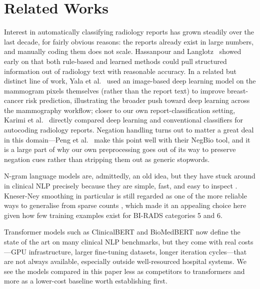 \documentclass[11pt,a4paper]{article}
\begin{document}
\section{Related Works}

Interest in automatically classifying radiology reports has grown steadily
over the last decade, for fairly obvious reasons: the reports already exist in
large numbers, and manually coding them does not scale.
Hassanpour and Langlotz~\cite{hassanpour2017information} showed early on that
both rule-based and learned methods could pull structured information out of
radiology text with reasonable accuracy. In a related but distinct line of
work, Yala et al.~\cite{yala2019deep} used an image-based deep learning model
on the mammogram pixels themselves (rather than the report text) to improve
breast-cancer risk prediction, illustrating the broader push toward deep
learning across the mammography workflow; closer to our own report-classification
setting, Karimi et al.~\cite{karimi2017automatic} directly compared deep
learning and conventional classifiers for autocoding radiology reports.
Negation handling turns out to matter a great deal in this domain---Peng et
al.~\cite{peng2018negbio} make this point well with their NegBio tool, and it
is a large part of why our own preprocessing goes out of its way to preserve
negation cues rather than stripping them out as generic stopwords.

N-gram language models are, admittedly, an old idea, but they have stuck
around in clinical NLP precisely because they are simple, fast, and easy to
inspect \cite{friedman2004natural}. Kneser-Ney smoothing in particular is still
regarded as one of the more reliable ways to generalise from sparse counts
\cite{chen1998evaluation}, which made it an appealing choice here given how few
training examples exist for BI-RADS categories 5 and 6.

Transformer models such as ClinicalBERT \cite{alsentzer2019publicly} and
BioMedBERT now define the state of the art on many clinical NLP benchmarks,
but they come with real costs---GPU infrastructure, larger fine-tuning
datasets, longer iteration cycles---that are not always available, especially
outside well-resourced hospital systems. We see the models compared in this
paper less as competitors to transformers and more as a lower-cost baseline
worth establishing first.
\end{document}
